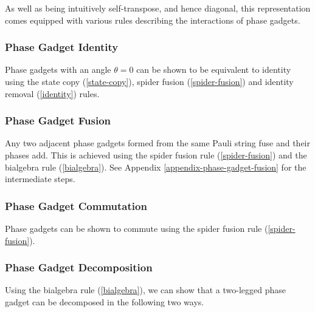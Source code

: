 As well as being intuitively self-transpose, and hence diagonal, this representation comes equipped with various rules describing the interactions of phase gadgets. 


\subsubsection{Phase Gadget Identity}%
\label{phase-gadget-identity}

Phase gadgets with an angle $\theta = 0$ can be shown to be equivalent to identity using the state copy (\ref{state-copy}), spider fusion (\ref{spider-fusion}) and identity removal (\ref{identity}) rules.



\subsubsection{Phase Gadget Fusion}%
\label{phase-gadget-fusion}

Any two adjacent phase gadgets formed from the same Pauli string fuse and their phases add. This is achieved using the spider fusion rule (\ref{spider-fusion}) and the bialgebra rule (\ref{bialgebra}). See Appendix  \ref{appendix-phase-gadget-fusion} for the intermediate steps.



\subsubsection{Phase Gadget Commutation}%
\label{phase-gadget-commutation}

Phase gadgets can be shown to commute using the spider fusion rule (\ref{spider-fusion}).



\subsubsection{Phase Gadget Decomposition}%

Using the bialgebra rule (\ref{bialgebra}), we can show that a two-legged phase gadget can be decomposed in the following two ways.

